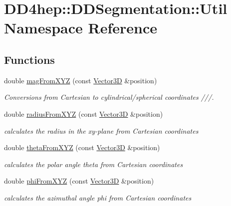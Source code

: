 \hypertarget{namespace_d_d4hep_1_1_d_d_segmentation_1_1_util}{}\section{D\+D4hep\+:\+:D\+D\+Segmentation\+:\+:Util Namespace Reference}
\label{namespace_d_d4hep_1_1_d_d_segmentation_1_1_util}
\subsection*{Functions}
\begin{DoxyCompactItemize}
\item 
double \hyperlink{namespace_d_d4hep_1_1_d_d_segmentation_1_1_util_a696e414df89c2948f71d83861bb91f96}{mag\+From\+X\+YZ} (const \hyperlink{struct_d_d4hep_1_1_d_d_segmentation_1_1_vector3_d}{Vector3D} \&position)
\begin{DoxyCompactList}\small\item\em Conversions from Cartesian to cylindrical/spherical coordinates ///. \end{DoxyCompactList}\item 
double \hyperlink{namespace_d_d4hep_1_1_d_d_segmentation_1_1_util_a27d8eaa8e3001150da1b4cf657eecbb0}{radius\+From\+X\+YZ} (const \hyperlink{struct_d_d4hep_1_1_d_d_segmentation_1_1_vector3_d}{Vector3D} \&position)
\begin{DoxyCompactList}\small\item\em calculates the radius in the xy-\/plane from Cartesian coordinates \end{DoxyCompactList}\item 
double \hyperlink{namespace_d_d4hep_1_1_d_d_segmentation_1_1_util_a91c9acb845023538b301430609481e0e}{theta\+From\+X\+YZ} (const \hyperlink{struct_d_d4hep_1_1_d_d_segmentation_1_1_vector3_d}{Vector3D} \&position)
\begin{DoxyCompactList}\small\item\em calculates the polar angle theta from Cartesian coordinates \end{DoxyCompactList}\item 
double \hyperlink{namespace_d_d4hep_1_1_d_d_segmentation_1_1_util_aa8b3866b06a01bd33c74b6b4d5ff48a7}{phi\+From\+X\+YZ} (const \hyperlink{struct_d_d4hep_1_1_d_d_segmentation_1_1_vector3_d}{Vector3D} \&position)
\begin{DoxyCompactList}\small\item\em calculates the azimuthal angle phi from Cartesian coordinates \end{DoxyCompactList}\item 

\end{DoxyCompactItemize}
